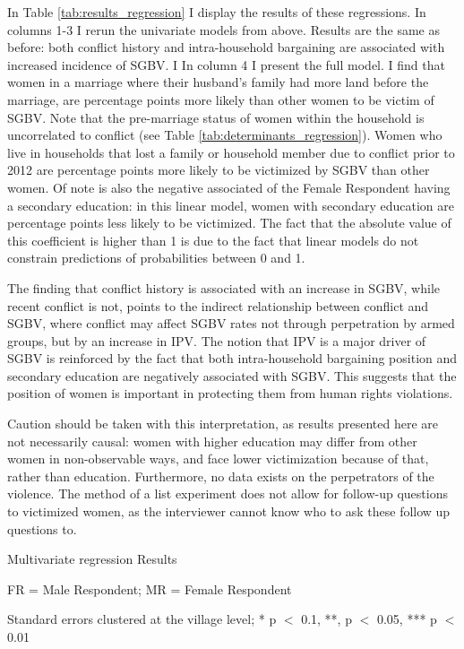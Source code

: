 In Table \ref{tab:results_regression} I display the results of these regressions. In columns 1-3 I rerun the univariate models from above. Results are the same as before: both conflict history and intra-household bargaining are associated with increased incidence of SGBV. I In column 4 I present the full model. I find that women in a marriage where their husband's family had more land before the marriage, are  percentage points more likely than other women to be victim of SGBV. Note that the pre-marriage status of women within the household is uncorrelated to conflict (see Table \ref{tab:determinants_regression}). Women who live in households that lost a family or household member due to conflict prior to 2012 are  percentage points more likely to be victimized by SGBV than other women. Of note is also the negative associated of the Female Respondent having a secondary education: in this linear model, women with secondary education are  percentage points less likely to be victimized. The fact that the absolute value of this coefficient is higher than 1 is due to the fact that linear models do not constrain predictions of probabilities between 0 and 1.

The finding that conflict history is associated with an increase in SGBV, while recent conflict is not, points to the indirect relationship between conflict and SGBV, where conflict may affect SGBV rates not through perpetration by armed groups, but by an increase in IPV. The notion that IPV is a major driver of SGBV is reinforced by the fact that both intra-household bargaining position and secondary education are negatively associated with SGBV.  This suggests that the position of women is important in protecting them from human rights violations.

Caution should be taken with this interpretation, as results presented here are not necessarily causal: women with higher education may differ from other women in non-observable ways, and face lower victimization because of that, rather than education. Furthermore, no data exists on the perpetrators of the violence. The method of a list experiment does not allow for follow-up questions to victimized women, as the interviewer cannot know who to ask these follow up questions to.

\begin{table}
\centering
\begin{threeparttable}
	\caption{Multivariate regression Results}\label{tab:results_regression}
	\singlespacing
	\centering
	\small
	
	
	\begin{tablenotes}
	\footnotesize
	 \item FR = Male Respondent; MR = Female Respondent
	 \item Standard errors clustered at the village level; * p $<$ 0.1, **, p $<$ 0.05, *** p $<$ 0.01
	\end{tablenotes}

\end{threeparttable}
\end{table}

